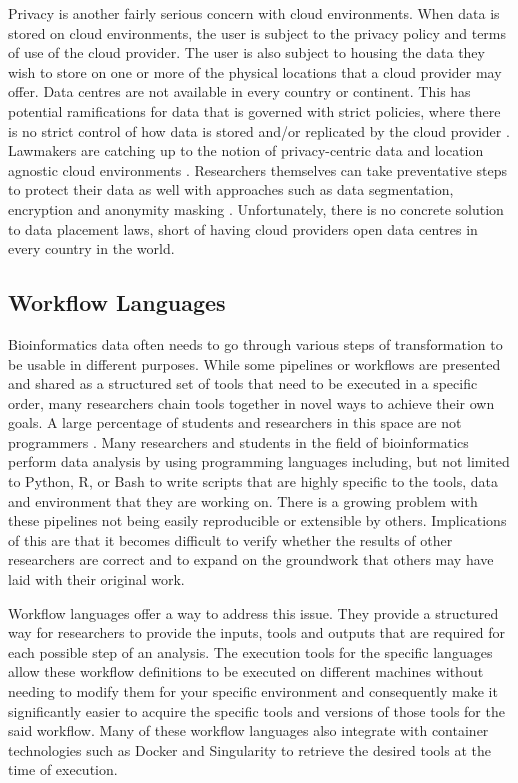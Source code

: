Privacy is another fairly serious concern with cloud environments. When data is stored on cloud environments, the user is subject to the privacy policy and terms of use of the cloud provider. The user is also subject to housing the data they wish to store on one or more of the physical locations that a cloud provider may offer. Data centres are not available in every country or continent. This has potential ramifications for data that is governed with strict policies, where there is no strict control of how data is stored and/or replicated by the cloud provider \parencite{abouelmehdi2017big}. Lawmakers are catching up to the notion of privacy-centric data and location agnostic cloud environments \parencite{gholami2016big}. Researchers themselves can take preventative steps to protect their data as well with approaches such as data segmentation, encryption and anonymity masking \parencite{sun2014data}. Unfortunately, there is no concrete solution to data placement laws, short of having cloud providers open data centres in every country in the world.



\subsection{Workflow Languages}

Bioinformatics data often needs to go through various steps of transformation to be usable in different purposes. While some pipelines or workflows are presented and shared as a structured set of tools that need to be executed in a specific order, many researchers chain tools together in novel ways to achieve their own goals. A large percentage of students and researchers in this space are not programmers \parencite{mesirov2010accessible}. Many researchers and students in the field of bioinformatics perform data analysis by using programming languages including, but not limited to Python, R, or Bash to write scripts that are highly specific to the tools, data and environment that they are working on. There is a growing problem with these pipelines not being easily reproducible or extensible by others. Implications of this are that it becomes difficult to verify whether the results of other researchers are correct and to expand on the groundwork that others may have laid with their original work.

Workflow languages offer a way to address this issue. They provide a structured way for researchers to provide the inputs, tools and outputs that are required for each possible step of an analysis. The execution tools for the specific languages allow these workflow definitions to be executed on different machines without needing to modify them for your specific environment and consequently make it significantly easier to acquire the specific tools and versions of those tools for the said workflow. Many of these workflow languages also integrate with container technologies such as Docker and Singularity to retrieve the desired tools at the time of execution.

